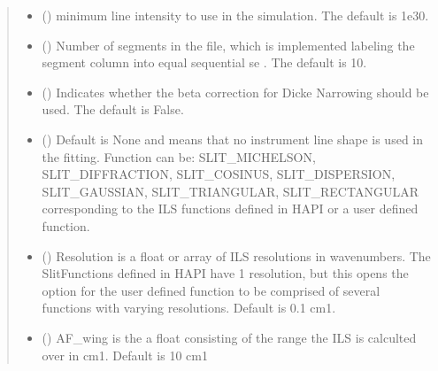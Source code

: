 \documentclass[letterpaper,10pt,english]{sphinxmanual}
\begin{document}
\begin{fulllineitems}
\begin{quote}
\begin{description}
\begin{itemize}
\item {} 
\sphinxAtStartPar
{} (\sphinxstyleliteralemphasis{\sphinxupquote{, }}) \textendash{} minimum line intensity to use in the simulation. The default is 1e\sphinxhyphen{}30.

\item {} 
\sphinxAtStartPar
{} (\sphinxstyleliteralemphasis{\sphinxupquote{, }}) \textendash{} Number of segments in the file, which is implemented labeling the segment column into equal sequential se . The default is 10.

\item {} 
\sphinxAtStartPar
{} (\sphinxstyleliteralemphasis{\sphinxupquote{, }}) \textendash{} Indicates whether the beta correction for Dicke Narrowing should be used.  The default is False.

\item {} 
\sphinxAtStartPar
{} (\sphinxstyleliteralemphasis{\sphinxupquote{, }}) \textendash{} Default is None and means that no instrument line shape is used in the fitting.
Function can be: SLIT\_MICHELSON, SLIT\_DIFFRACTION, SLIT\_COSINUS, SLIT\_DISPERSION, SLIT\_GAUSSIAN, SLIT\_TRIANGULAR, SLIT\_RECTANGULAR corresponding to the ILS functions defined in HAPI or a user defined function.

\item {} 
\sphinxAtStartPar
{} (\sphinxstyleliteralemphasis{\sphinxupquote{, }}) \textendash{} Resolution is a float or array of ILS resolutions in wavenumbers.  The SlitFunctions defined in HAPI have 1 resolution, but this opens the option for the user defined function to be comprised of several functions with varying resolutions.  Default is 0.1 cm\sphinxhyphen{}1.

\item {} 
\sphinxAtStartPar
{} (\sphinxstyleliteralemphasis{\sphinxupquote{, }}) \textendash{} AF\_wing is the a float consisting of the range the ILS is calculted over in cm\sphinxhyphen{}1. Default is 10 cm\sphinxhyphen{}1


\end{itemize}
\end{description}
\end{quote}
\end{fulllineitems}
\end{document}
